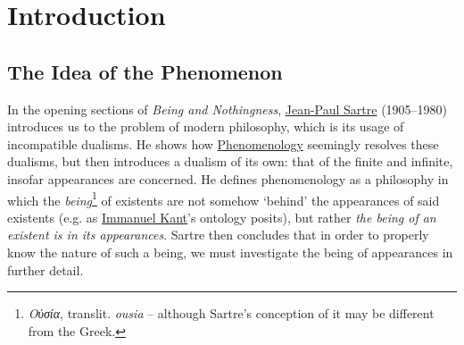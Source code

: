 \chapter{Introduction}
\section{The Idea of the Phenomenon}

In the opening sections of \emph{Being and Nothingness}, \href{https://plato.stanford.edu/entries/sartre/}{Jean-Paul Sartre} (1905–1980) introduces us to the problem of modern philosophy,
which is its usage of incompatible dualisms. He shows how \href{https://plato.stanford.edu/entries/phenomenology/}{Phenomenology} seemingly resolves these dualisms, but then introduces a dualism of its own: that of the finite and infinite, insofar appearances are concerned. He defines phenomenology as a philosophy in which the \emph{being}\footnote{\emph{Οὐσία}, translit. \emph{ousia} -- although Sartre's conception of it may be different from the Greek.} of existents are not somehow \enquote*{behind} the appearances of said existents (e.g. as \href{https://plato.stanford.edu/entries/kant/}{Immanuel Kant}'s ontology posits), but rather \emph{the being of an existent is in its appearances}. Sartre then concludes that in order to properly know the nature of such a being, we must investigate the being of appearances in further detail.

